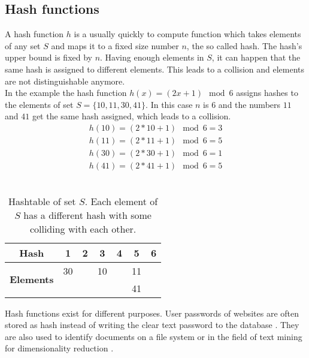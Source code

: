 \subsection{Hash functions}
A hash function $ h $ is a usually quickly to compute function which takes  elements of any set $ S $ and maps it to a fixed size number $ n $, the so called hash. The hash's upper bound is fixed by $ n $. Having enough elements in $ S $, it can happen that the same hash is assigned to different elements. This leads to a collision and elements are not distinguishable anymore.\\


In the example the hash function $ h(x) = (2x+1) \mod 6 $ assigns hashes to the elements of set $ S = \{ 10,11,30,41 \} $.  In this case $ n $ is $ 6 $ and the numbers $ 11 $ and $ 41 $ get the same hash assigned, which leads to a collision.\\

\begin{equation}
    \begin{split}
        h(10) = (2 * 10 + 1) \mod 6 = 3  \\
        h(11) = (2 * 11 + 1) \mod 6 = 5 \\
        h(30) = (2 * 30 + 1) \mod 6 = 1 \\
        h(41) = (2 * 41 + 1) \mod 6 = 5
    \end{split}
\end{equation}\\

\begin{table}[H]
    \centering
    \begin{tabular}{| c | c | c | c | c | c | c |}
        \hline
        \textbf{Hash} & \textbf{1} & \textbf{2} & \textbf{3} & \textbf{4} & \textbf{5} & \textbf{6}  \\
        \hline
        \multirow{2}{*}{\textbf{Elements}}   & 30 &    & 10 &    & 11 & \\
        &    &    &    &    & 41  &\\
        \hline
    \end{tabular}    
    \caption{Hashtable of set $ S $. Each element of $ S $ has a different  hash with some colliding with each other.}
\end{table}

Hash functions exist for different purposes. User passwords of websites are often stored as hash instead of writing the clear text password to the database \cite{cryptographicHashFunctions}. They are also used to identify documents on a file system or in the field of text mining for dimensionality reduction \cite{practicalHashFunctions}.\\

